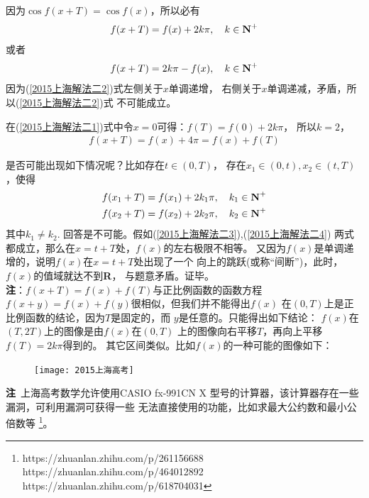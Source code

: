 \begin{enumerate}[label={【\textbf{例\thechapter.\arabic*}】},
 leftmargin=\inteval{\myenumleftmargin}pt,
 itemsep=\inteval{\myenumitempsep}pt,
 itemindent=\inteval{\myenumitemindent}pt]
%
因为$ \cos f(x+T)=\cos f(x) $，所以必有
\begin{gather} \label{2015上海解法二1}
    f(x+T)= f(x) +2k\pi,\quad k\in \textbf{N}^+ 
\end{gather}
或者
\begin{gather}\label{2015上海解法二2}
    f(x+T)= 2k\pi-f(x),\quad k\in \textbf{N}^+
\end{gather}
因为(\ref{2015上海解法二2})式左侧关于$ x $单调递增，
右侧关于$ x $单调递减，矛盾，所以(\ref{2015上海解法二2})式
不可能成立。

在(\ref{2015上海解法二1})式中令$ x=0 $可得：$ f(T)=f(0)+2k\pi $，
所以$ k=2 $，
\begin{gather*}
    f(x+T)=f(x)+4\pi=f(x)+f(T)
\end{gather*}

是否可能出现如下情况呢？比如存在$ t\in(0,T) $，
存在$ x_1\in(0,t),x_2\in (t,T) $，使得
\begin{align}
    f(x_1+T) &= f(x_1) +2k_1\pi,\quad k_1\in \textbf{N}^+ \label{2015上海解法二3}  \\
    f(x_2+T) &= f(x_2) +2k_2\pi,\quad k_2\in \textbf{N}^+ \label{2015上海解法二4}
\end{align}
其中$ k_1\neq k_2 $. 
回答是不可能。假如(\ref{2015上海解法二3}),(\ref{2015上海解法二4})
两式都成立，那么在$ x=t+T $处，$ f(x) $的左右极限不相等。
又因为$ f(x) $是单调递增的，说明$ f(x) $在$ x=t+T $处出现了一个
向上的跳跃(或称“间断”)，此时，$ f(x) $的值域就达不到\textbf{R}，
与题意矛盾。证毕。\\
\textbf{注}：$ f(x+T)=f(x)+f(T) $与正比例函数的函数方程
$ f(x+y)=f(x)+f(y) $很相似，但我们并不能得出$ f(x) $
在$ (0,T) $上是正比例函数的结论，因为$ T $是固定的，而
$ y $是任意的。只能得出如下结论：
$ f(x) $在$ (T,2T) $上的图像是由$ f(x) $在$ (0,T) $
上的图像向右平移$ T $，再向上平移$ f(T)=2k\pi $得到的。
其它区间类似。比如$ f(x) $的一种可能的图像如下：
\begin{figure}[!ht]
    \centering
    \texttt{[image: 2015上海高考]}
\end{figure}

\textbf{注}\ 上海高考数学允许使用CASIO fx-991CN X
型号的计算器，该计算器存在一些漏洞，可利用漏洞可获得一些
无法直接使用的功能，比如求最大公约数和最小公倍数等
\footnote{
    https://zhuanlan.zhihu.com/p/261156688\\
    https://zhuanlan.zhihu.com/p/464012892\\
    https://zhuanlan.zhihu.com/p/618704031}。


\end{enumerate}

